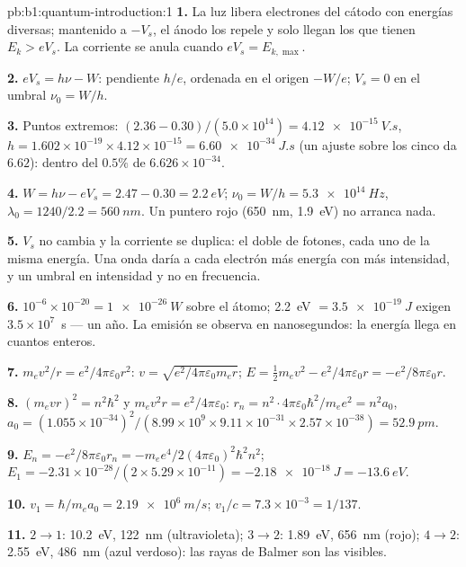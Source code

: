 \begin{solution}{pb:b1:quantum-introduction:1}
\textbf{1.} La luz libera electrones del cátodo con energías diversas;
mantenido a $-V_s$, el ánodo los repele y solo llegan los que tienen
$E_k > eV_s$. La corriente se anula cuando $eV_s = E_{k,\max}$.

\textbf{2.} $eV_s = h\nu - W$: pendiente $h/e$, ordenada en el origen $-W/e$; $V_s = 0$ en
el umbral $\nu_0 = W/h$.

\textbf{3.} Puntos extremos: $(2.36 - 0.30)/(5.0 \times 10^{14}) = \qty{4.12e-15}{V.s}$,
$h = 1.602 \times 10^{-19} \times 4.12 \times 10^{-15} = \qty{6.60e-34}{J.s}$ (un ajuste sobre
los cinco da $6.62$): dentro del $0.5\%$ de $6.626 \times 10^{-34}$.

\textbf{4.} $W = h\nu - eV_s = 2.47 - 0.30 = \qty{2.2}{eV}$; $\nu_0 = W/h =
\qty{5.3e14}{Hz}$, $\lambda_0 = 1240/2.2 = \qty{560}{nm}$. Un puntero rojo
(\qty{650}{nm}, \qty{1.9}{eV}) no arranca nada.

\textbf{5.} $V_s$ no cambia y la corriente se duplica: el doble de fotones,
cada uno de la misma energía. Una onda daría a cada electrón más energía
con más intensidad, y un umbral en intensidad y no en frecuencia.

\textbf{6.} $10^{-6} \times 10^{-20} = \qty{1e-26}{W}$ sobre el átomo; \qty{2.2}{eV} $=
\qty{3.5e-19}{J}$ exigen $3.5 \times 10^7$~s --- un año. La emisión se observa
en nanosegundos: la energía llega en cuantos enteros.

\textbf{7.} $m_ev^2/r = e^2/4\pi\varepsilon_0r^2$: $v = \sqrt{e^2/4\pi\varepsilon_0m_er}$; $E =
\tfrac12m_ev^2 - e^2/4\pi\varepsilon_0r = -e^2/8\pi\varepsilon_0r$.

\textbf{8.} $(m_evr)^2 = n^2\hbar^2$ y $m_ev^2r = e^2/4\pi\varepsilon_0$: $r_n = n^2 \cdot
4\pi\varepsilon_0\hbar^2/m_ee^2 = n^2a_0$, $a_0 = (1.055 \times 10^{-34})^2/(8.99 \times 10^9
\times 9.11 \times 10^{-31} \times 2.57 \times 10^{-38}) = \qty{52.9}{pm}$.

\textbf{9.} $E_n = -e^2/8\pi\varepsilon_0r_n = -m_ee^4/2(4\pi\varepsilon_0)^2\hbar^2n^2$; $E_1 =
-2.31 \times 10^{-28}/(2 \times 5.29 \times 10^{-11}) = \qty{-2.18e-18}{J} = \qty{-13.6}{eV}$.

\textbf{10.} $v_1 = \hbar/m_ea_0 = \qty{2.19e6}{m/s}$; $v_1/c = 7.3 \times 10^{-3} =
1/137$.

\textbf{11.} $2 \to 1$: \qty{10.2}{eV}, \qty{122}{nm} (ultravioleta); $3 \to 2$:
\qty{1.89}{eV}, \qty{656}{nm} (rojo); $4 \to 2$: \qty{2.55}{eV}, \qty{486}{nm}
(azul verdoso): las rayas de Balmer son las visibles.


\end{solution}

